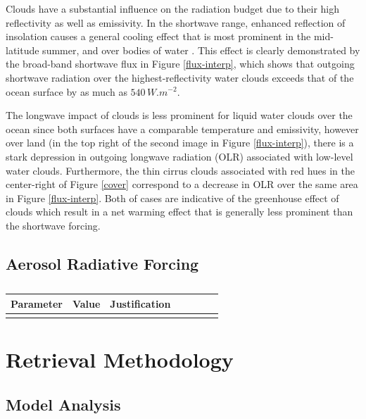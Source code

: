 \documentclass[12pt]{article}
\begin{document}
     Clouds have a substantial influence on the radiation budget due to their high reflectivity as well as emissivity. In the shortwave range, enhanced reflection of insolation causes a general cooling effect that is most prominent in the mid-latitude summer, and over bodies of water \cite{harrison_seasonal_1990}. This effect is clearly demonstrated by the broad-band shortwave flux in Figure \ref{flux-interp}, which shows that outgoing shortwave radiation over the highest-reflectivity water clouds exceeds that of the ocean surface by as much as $540\,\si{W.m^{-2}}$.

    The longwave impact of clouds is less prominent for liquid water clouds over the ocean since both surfaces have a comparable temperature and emissivity, however over land (in the top right of the second image in Figure \ref{flux-interp}), there is a stark depression in outgoing longwave radiation (OLR) associated with low-level water clouds. Furthermore, the thin cirrus clouds associated with red hues in the center-right of Figure \ref{cover} correspond to a decrease in OLR over the same area in Figure \ref{flux-interp}. Both of cases are indicative of the greenhouse effect of clouds which result in a net warming effect that is generally less prominent than the shortwave forcing.

    \subsection{Aerosol Radiative Forcing}

\begin{table}[h!]
    \centering
    \begin{tabular}{ m{.15\linewidth} | m{.15\linewidth} | m{0.6\linewidth}}
        \textbf{Parameter} & \textbf{Value} & \textbf{Justification} \\
        \hline
        & & \\
    \end{tabular}
    \caption{}
    \label{}
\end{table}

\section{Retrieval Methodology}

\subsection{Model Analysis}
\end{document}
